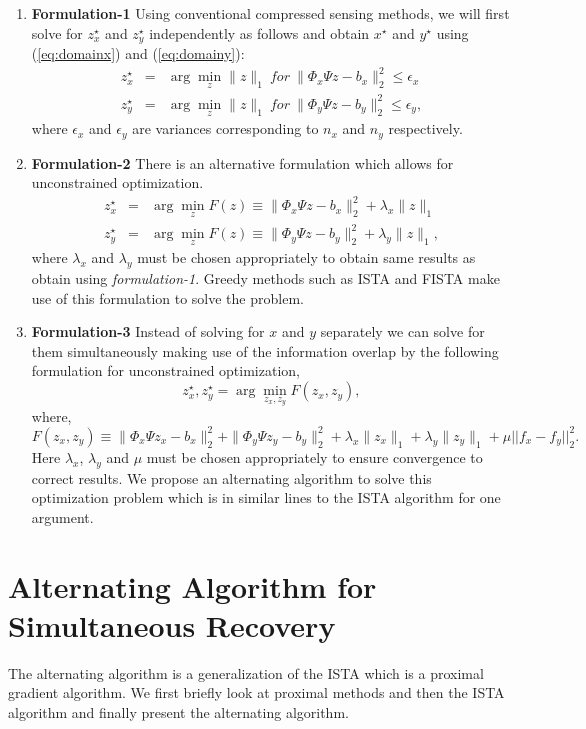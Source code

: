\begin{enumerate}
\item \textbf{Formulation-1} 
Using conventional compressed sensing methods, we will first solve for $z_x^\star$ and $z_y^\star$ independently  as follows and obtain $x^\star$ and $y^\star$ using (\ref{eq:domainx}) and  (\ref{eq:domainy}):
\begin{eqnarray}
 z_x^\star &=&  \arg \min_z \| z \|_1 \ for \ \|\Phi_x \Psi z -b_x\|_2^2 \leq \epsilon_x \\
 z_y^\star &=&  \arg \min_z \| z \|_1 \ for \ \|\Phi_y \Psi z -b_y\|_2^2 \leq \epsilon_y,
 \label{form1}
\end{eqnarray}
where $\epsilon_x$ and $\epsilon_y$ are variances corresponding to $n_x$ and $n_y$ respectively.


\item \textbf{Formulation-2} There is an alternative formulation which allows for unconstrained optimization.
\begin{eqnarray}
 z_x^\star &=& \arg \min_z F(z) \equiv \|\Phi_x\Psi z - b_x\|_2^2 + \lambda_x \|z\|_1\\
 z_y^\star &=& \arg \min_z F(z) \equiv \|\Phi_y\Psi z - b_y\|_2^2 + \lambda_y \|z\|_1,
\label{form2}
 \end{eqnarray}
where $\lambda_x$ and $\lambda_y$ must be chosen appropriately to obtain same results as obtain using \emph{formulation-1}.
Greedy methods such as ISTA and FISTA make use of this formulation to solve the problem.
\item \textbf{Formulation-3} Instead of solving for $x$ and $y$ separately we can solve for them simultaneously making use of the information overlap by the following formulation for unconstrained optimization,
 \begin{equation}
 z_x^\star, z_y^\star = \arg \min_{z_x, z_y} F(z_x, z_y),
 \end{equation}
where,
 \begin{equation}
 F(z_x, z_y) \equiv \|\Phi_x\Psi z_x - b_x\|_2^2 + \|\Phi_y\Psi z_y - b_y\|_2^2 + \lambda_x \|z_x\|_1 + \lambda_y \|z_y\|_1 + \mu ||f_x - f_y||_2^2.
 \end{equation}
Here $\lambda_x$, $\lambda_y$ and $\mu$ must be chosen appropriately to ensure convergence to correct results. We propose an alternating algorithm to solve this optimization problem which is in similar lines to the ISTA algorithm for one argument.

\end{enumerate}\section{Alternating Algorithm for Simultaneous Recovery}
The alternating algorithm is a generalization of the ISTA  which is a proximal gradient algorithm. We first  briefly look at proximal methods and then the ISTA algorithm and finally present the alternating algorithm.
